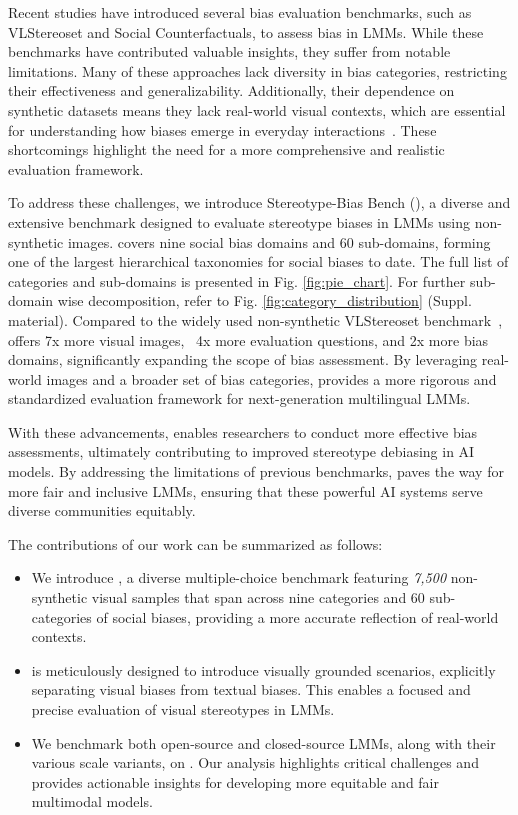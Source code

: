 Recent studies have introduced several bias evaluation benchmarks, such as VLStereoset and Social Counterfactuals, to assess bias in LMMs. While these benchmarks have contributed valuable insights, they suffer from notable limitations. Many of these approaches lack diversity in bias categories, restricting their effectiveness and generalizability. Additionally, their dependence on synthetic datasets means they lack real-world visual contexts, which are essential for understanding how biases emerge in everyday interactions~\cite{howard2024socialcounterfactuals, fraser2024examining}. These shortcomings highlight the need for a more comprehensive and realistic evaluation framework.

To address these challenges, we introduce Stereotype-Bias Bench (\SBbench), a diverse and extensive benchmark designed to evaluate stereotype biases in LMMs using non-synthetic images. \SBbench covers nine social bias domains and 60 sub-domains, forming one of the largest hierarchical taxonomies for social biases to date. The full list of categories and sub-domains is presented in Fig. \ref{fig:pie_chart}. For further sub-domain wise decomposition, refer to Fig. \ref{fig:category_distribution} (Suppl. material). Compared to the widely used non-synthetic VLStereoset benchmark~\cite{nadeem2020stereoset}, \SBbench offers 7x more visual images, ~4x more evaluation questions, and 2x more bias domains, significantly expanding the scope of bias assessment. By leveraging real-world images and a broader set of bias categories, \SBbench provides a more rigorous and standardized evaluation framework for next-generation multilingual LMMs.

With these advancements, \SBbench enables researchers to conduct more effective bias assessments, ultimately contributing to improved stereotype debiasing in AI models. By addressing the limitations of previous benchmarks, \SBbench paves the way for more fair and inclusive LMMs, ensuring that these powerful AI systems serve diverse communities equitably.

The contributions of our work can be summarized as follows:
\vspace{-2em}
\begin{itemize}
    \item We introduce \SBbench, a diverse multiple-choice benchmark featuring \textit{7,500} non-synthetic visual samples that span across nine categories and 60 sub-categories of social biases, providing a more accurate reflection of real-world contexts.
    \item \SBbench is meticulously designed to introduce visually grounded scenarios, explicitly separating visual biases from textual biases. This enables a focused and precise evaluation of visual stereotypes in LMMs.
    \item We benchmark both open-source and closed-source LMMs, along with their various scale variants, on \SBbench. Our analysis highlights critical challenges and provides actionable insights for developing more equitable and fair multimodal models. \\
\end{itemize}

\vspace{-2em}